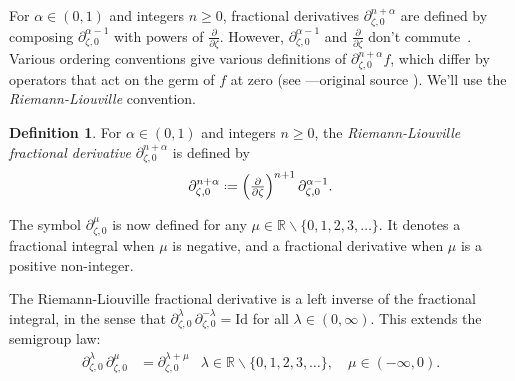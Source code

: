 \documentclass{article}
\theoremstyle{definition}
\newcommand{\R}{\mathbb{R}}
\newcommand{\fracderiv}[3]{\partial^{#1}_{#2, #3}}
\newcommand*{\defeq}{\mathrel{\vcenter{\baselineskip0.5ex \lineskiplimit0pt
                     \hbox{\scriptsize.}\hbox{\scriptsize.}}}%
                     =}
\newcommand{\laplace}{\mathcal{L}}
\newtheorem{definition}{Definition}[section]
\begin{document}
For $\alpha \in (0, 1)$ and integers $n \ge 0$, fractional derivatives $\fracderiv{n+\alpha}{\zeta}{0}$ are defined by composing $\fracderiv{\alpha-1}{\zeta}{0}$ with powers of $\tfrac{\partial}{\partial \zeta}$. However, $\fracderiv{\alpha-1}{\zeta}{0}$ and $\tfrac{\partial}{\partial \zeta}$ don't commute~\cite[equation 54]{mladenov2014advanced}. Various ordering conventions give various definitions of $\fracderiv{n+\alpha}{\zeta}{0} f$, which differ by operators that act on the germ of $f$ at zero (see \cite[Section 1.3]{mladenov2014advanced}---original source \cite{podlubny}). We'll use the {\em Riemann-Liouville} convention.
\begin{definition}
For $\alpha \in (0, 1)$ and integers $n \ge 0$, the {\em Riemann-Liouville fractional derivative} $\fracderiv{n+\alpha}{\zeta}{0}$ is defined by
\[ \fracderiv{n+\alpha}{\zeta}{0} \defeq \left(\tfrac{\partial}{\partial \zeta}\right)^{n+1} \fracderiv{\alpha-1}{\zeta}{0}. \]
\end{definition}
The symbol $\fracderiv{\mu}{\zeta}{0}$ is now defined for any $\mu \in \R \smallsetminus \{0, 1, 2, 3, \ldots\}$. It denotes a fractional integral when $\mu$ is negative, and a fractional derivative when $\mu$ is a positive non-integer.

The Riemann-Liouville fractional derivative is a left inverse of the fractional integral, in the sense that $\fracderiv{\lambda}{\zeta}{ 0}\,\fracderiv{-\lambda}{\zeta}{0}=\text{Id}$ for all $\lambda \in (0, \infty)$. This extends the semigroup law:
\begin{align*}
\fracderiv{\lambda}{\zeta}{0}\,\fracderiv{\mu}{\zeta}{0} & = \fracderiv{\lambda+\mu}{\zeta}{0} & \lambda \in \R \smallsetminus \{0, 1, 2, 3, \ldots\},\quad\mu \in (-\infty, 0).
\end{align*}


\end{document}
